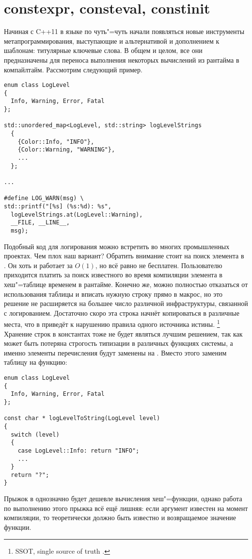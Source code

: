 \section{constexpr, consteval, constinit}
Начиная с C++11 в языке по чуть"=чуть начали появляться новые инструменты метапрограммирования, выступающие и альтернативой и дополнением к шаблонам: титулярные ключевые слова.
В общем и целом, все они предназначены для переноса выполнения некоторых вычислений из рантайма в компайлтайм.
Рассмотрим следующий пример.
\begin{verbatim}
enum class LogLevel
{
  Info, Warning, Error, Fatal
};

std::unordered_map<LogLevel, std::string> logLevelStrings
  {
    {Color::Info, "INFO"},
    {Color::Warning, "WARNING"},
    ...
  };

...

#define LOG_WARN(msg) \
std::printf("[%s] (%s:%d): %s",
  logLevelStrings.at(LogLevel::Warning),
  __FILE, __LINE__,
  msg);
\end{verbatim}
Подобный код для логирования можно встретить во многих промышленных проектах.
Чем плох наш вариант? Обратить внимание стоит на поиск элемента в .
Он хоть и работает за $O(1)$, но всё равно не бесплатен.
Пользователю приходится платить за поиск известного во время компиляции элемента в хеш"=таблице временем в рантайме.
Конечно же, можно полностью отказаться от использования таблицы и вписать нужную строку прямо в макрос, но это решение не расширяется на большее число различной инфраструктуры, связанной с логированием.
Достаточно скоро эта строка начнёт копироваться в различные места, что в приведёт к нарушению правила одного источника истины.
\footnote{SSOT, single source of truth \cite{ssotWiki}.}
Хранение строк в константах тоже не будет являться лучшим решением, так как может быть потеряна строгость типизации в различных функциях системы, а именно элементы перечисления будут заменены на .
Вместо этого заменим таблицу на функцию:
\begin{verbatim}
enum class LogLevel
{
  Info, Warning, Error, Fatal
};

const char * logLevelToString(LogLevel level)
{
  switch (level)
  {
    case LogLevel::Info: return "INFO";
    ...
  }
  return "?";
}
\end{verbatim}
Прыжок в  однозначно будет дешевле вычисления хеш"=функции, однако работа по выполнению этого прыжка всё ещё лишняя: если аргумент  известен на момент компиляции, то теоретически должно быть известно и возвращаемое значение функции.
